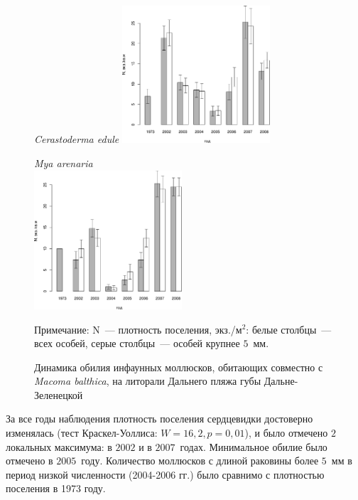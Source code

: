 	\begin{figure}[p]
	
	\begin{minipage}[b]{.46\linewidth}
	\begin{center}
	{\footnotesize \textit{Cerastoderma edule}}
		\includegraphics[width=55mm]{../after_Deryuginskie/2_disser/cockle_N_dynamic_all1.pdf}
	\end{center}
	\end{minipage}
	\hfil %
	\begin{minipage}[b]{.46\linewidth}
	\begin{center}
	{\footnotesize \textit{Mya arenaria}}\\
		\includegraphics[width=55mm]{../after_Deryuginskie/2_disser/Mya_N_dynamic_all1.pdf}
	\end{center}
	\end{minipage}
\caption{Динамика обилия инфаунных моллюсков, обитающих совместно с {\it Macoma balthica}, на литорали Дальнего пляжа губы Дальне-Зеленецкой}
\label{ris:DZ_N_dynamic_bivalve}

{\footnotesize Примечание: N~--- плотность поселения, экз./м$^2$: белые столбцы~--- всех особей, серые столбцы~--- особей крупнее $5$~мм.}
\end{figure}
%
За все годы наблюдения плотность поселения сердцевидки достоверно изменялась (тест Краскел-Уоллиса: $W=16,2, p=0,01$), и было отмечено $2$ локальных максимума: в $2002$ и в $2007$~годах. 
Минимальное обилие было отмечено в $2005$~году. 
Количество моллюсков с длиной раковины более $5$~мм в период низкой численности (2004-2006 гг.) было сравнимо с плотностью поселения в 1973 году.

